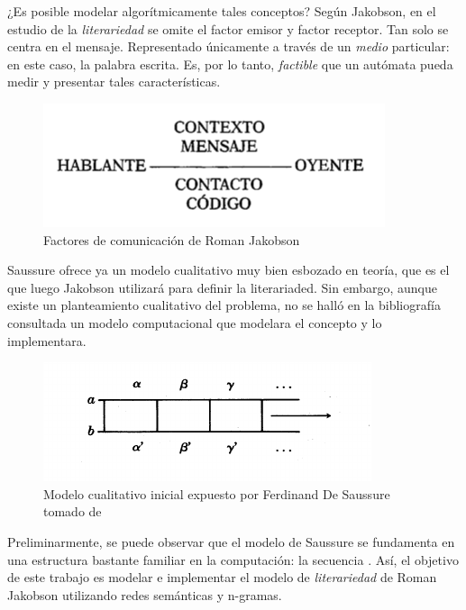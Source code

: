 \documentclass[twoside]{article}
\begin{document}
¿Es posible  modelar algorítmicamente  tales conceptos? Según
Jakobson, en el estudio de la \emph{literariedad} se omite el factor emisor
y factor receptor. Tan solo se centra en el mensaje. Representado
 únicamente a través de un \emph{medio} particular: en este caso, la palabra escrita.
Es, por lo tanto,  \emph{factible} que un autómata pueda medir y presentar tales
características. 

\begin{figure}[htbp]
\centering
\includegraphics[width=.9\linewidth]{./assets/factores_comunicacion.png}
\caption{Factores de comunicación de Roman Jakobson \cite{jakobson1981linguistica}}
\end{figure}

Saussure ofrece ya un modelo cualitativo muy bien esbozado en teoría,
que es el que luego Jakobson utilizará para definir la literariaded.
Sin embargo, aunque existe un planteamiento cualitativo del problema,
no se halló en la bibliografía consultada un modelo computacional que
modelara el concepto y lo implementara. 

\begin{figure}[htbp]
\centering
\includegraphics[width=.9\linewidth]{./assets/delimitacion_saussure.png}
\caption{Modelo cualitativo inicial expuesto por Ferdinand De Saussure tomado de \cite{eijembaum2010teoria}}
\end{figure}

Preliminarmente, se puede observar que el modelo de Saussure se
fundamenta en una estructura bastante familiar en la computación: la
secuencia \cite{alonso1945curso}. Así, el objetivo de este trabajo es modelar e implementar el
modelo de \emph{literariedad} de Roman Jakobson utilizando redes semánticas
y n-gramas.
\end{document}
